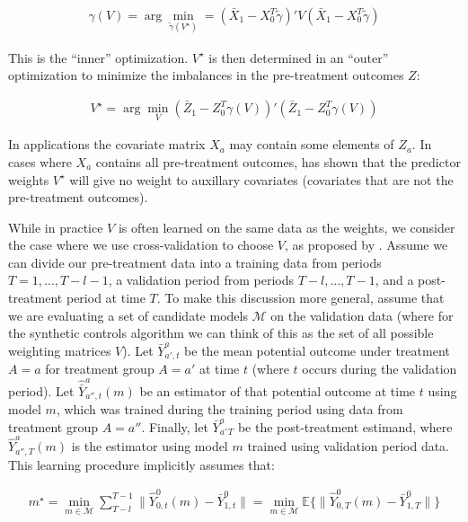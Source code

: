 \begin{align}
\gamma(V) = \arg\min_{\tilde{\gamma}(V^\star)} = (\bar{X}_1 - X_0^T\tilde{\gamma})'V(\bar{X}_1 - X_0^T\tilde{\gamma}) 
\end{align}

This is the ``inner'' optimization. $V^\star$ is then determined in an ``outer'' optimization to minimize the imbalances in the pre-treatment outcomes $Z$:

\begin{align}
    V^\star = \arg\min_V (\bar{Z}_1 - Z_0^T\gamma(V))'(\bar{Z}_1 - Z_0^T\gamma(V))
\end{align}

In applications the covariate matrix $X_a$ may contain some elements of $Z_a$. In cases where $X_a$ contains all pre-treatment outcomes, \cite{kaul2015synthetic} has shown that the predictor weights $V^\star$ will give no weight to auxillary covariates (covariates that are not the pre-treatment outcomes). 

While in practice $V$ is often learned on the same data as the weights, we consider the case where we use cross-validation to choose $V$, as proposed by \cite{abadie2015comparative}. Assume we can divide our pre-treatment data into a training data from periods $T = 1, ..., T - l - 1$, a validation period from periods $T - l, ..., T - 1$, and a post-treatment period at time $T$. To make this discussion more general, assume that we are evaluating a set of candidate models $\mathcal{M}$ on the validation data (where for the synthetic controls algorithm we can think of this as the set of all possible weighting matrices $V$). Let $\bar{Y}^a_{a', t}$ be the mean potential outcome under treatment $A = a$ for treatment group $A = a'$ at time $t$ (where $t$ occurs during the validation period). Let $\hat{\bar{Y}}^a_{a'', t}(m)$ be an estimator of that potential outcome at time $t$ using model $m$, which was trained during the training period using data from treatment group $A = a''$. Finally, let $\bar{Y}_{a'}^a_T$ be the post-treatment estimand, where $\hat{Y}^a_{a'', T}(m)$ is the estimator using model $m$ trained using validation period data. This learning procedure implicitly assumes that:

\begin{align*}
m^\star = \min_{m \in \mathcal{M}}\sum_{T - l}^{T-1}\|\hat{Y}^0_{0, t}(m) - \bar{Y}^0_{1, t}\| = \min_{m \in \mathcal{M}}\mathbb{E}\{\|\hat{Y}^0_{0, T}(m) - \bar{Y}^0_{1, T}\|\}
\end{align*}


